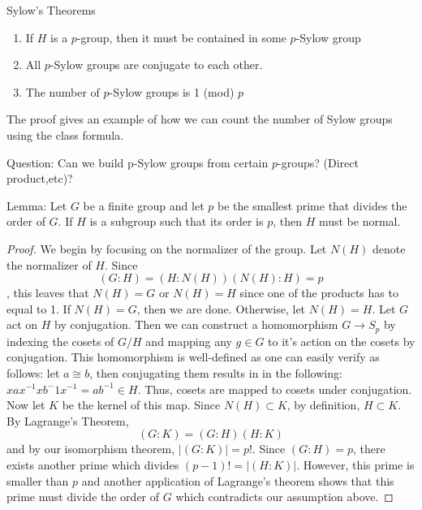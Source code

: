 \documentclass[12pt]{article}
\begin{document}
Sylow's Theorems

\begin{enumerate}
\item If $H$ is a $p$-group, then it must be contained in some $p$-Sylow group
\item All $p$-Sylow groups are conjugate to each other.
\item The number of $p$-Sylow groups is 1 (mod) $p$
\end{enumerate}

The proof gives an example of how we can count the number of Sylow groups using the class formula.

Question: Can we build p-Sylow groups from certain $p$-groups? (Direct product,etc)?

\par Lemma: Let $G$ be a finite group and let $p$ be the smallest prime that divides the order of $G$. If $H$ is a subgroup such that its order is $p$, then $H$ must be normal.

\begin{proof}
 We begin by focusing on the normalizer of the group. Let $N(H)$ denote the normalizer of $H$. Since $$ (G:H) = (H:N(H))(N(H): H) = p$$, this leaves that $N(H) = G$ or $N(H) = H$ since one of the products has to equal to 1. If $N(H) = G$, then we are done. Otherwise, let $N(H) = H$. Let $G$ act on $H$ by conjugation. Then we can construct a homomorphism $G \rightarrow S_p$ by indexing the cosets of $G/H$ and mapping any $g \in G$ to it's action on the cosets by conjugation. This homomorphism is well-defined as one can easily verify as follows:
let $a \cong b$, then conjugating them results in in the following: $xax^{-1}xb^-1x^{-1} = ab^{-1} \in H$. Thus, cosets are mapped to cosets under conjugation. Now let $K$ be the kernel of this map. Since $N(H) \subset K$, by definition, $H \subset K$. By Lagrange's Theorem, $$ (G: K) = (G: H)(H:K) $$ and by our isomorphism theorem, $|(G:K)| = p!$. Since $(G:H) = p$, there exists another prime which divides $(p-1)! = |(H:K)|$. However, this prime is smaller than $p$ and another application of Lagrange's theorem shows that this prime must divide the order of $G$ which contradicts our assumption above.
\end{proof}
\end{document}
